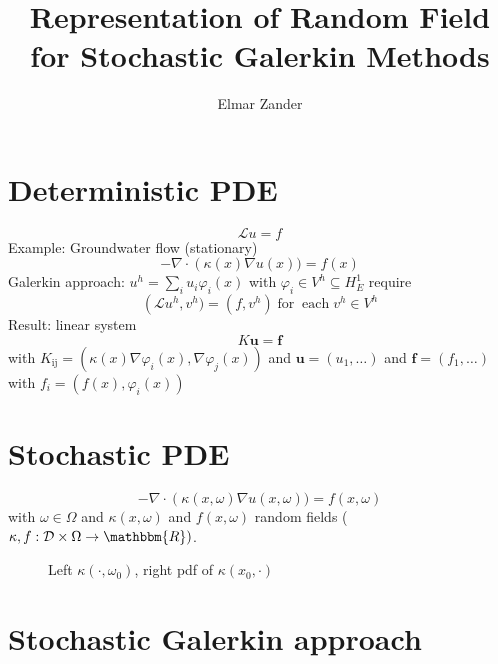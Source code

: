 \documentclass{article}
\newcommand{\tmmathbf}[1]{\ensuremath{\boldsymbol{#1}}}
\newcommand{\tmop}[1]{\ensuremath{\operatorname{#1}}}
\begin{document}
\title{Representation of Random Field for Stochastic Galerkin
Methods}\author{Elmar Zander}\maketitle

\begin{figure}[h]
  \caption{}
\end{figure}

{\newpage}

\section{Deterministic PDE}

\[ \mathcal{L} u = f \]
Example: Groundwater flow (stationary)
\[ - \nabla \cdot \left( \kappa (x) \nabla u (x)) = f (x) \right. \]
Galerkin approach: $u^h = \sum_i u_i \varphi_i (x)$ with $\varphi_i \in V^h
\subseteq H^1_E$ require
\[ \left( \mathcal{L} u^h, v^h) = (f, v^h) \tmop{for} \tmop{each} v^h \in V^h
   \right. \]
Result: linear system
\[ K \tmmathbf{u} = \tmmathbf{f} \]
with $K_{\tmop{ij}} = (\kappa (x) \nabla \varphi_i (x), \nabla \varphi_j (x))$
and $\tmmathbf{u} = \left( u_1, \ldots \right)$ and $\tmmathbf{f} = (f_1,
\ldots)$ with $f_i = \left( f (x), \varphi_i (x) \right)$







{\newpage}

\section{Stochastic PDE}

\[ - \nabla \cdot \left( \kappa (x, \omega) \nabla u (x, \omega)) = f (x,
   \omega) \right. \]
with $\omega \in \Omega$ and $\kappa (x, \omega)$ and $f (x, \omega)$ random
fields ($\kappa, f : \mathcal{D} \times \Omega \rightarrow \mathbbm{R})$.

\begin{figure}[h]
  \caption{Left $\kappa (\cdot, \omega_0)$, right pdf of $\kappa (x_0,
  \cdot)$}
\end{figure}

{\newpage}

\section{Stochastic Galerkin approach }
\end{document}
